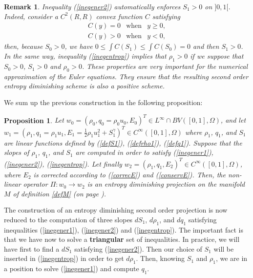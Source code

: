 \documentclass{fldauth}
\theoremstyle{plain}
\theoremstyle{plain}
\theoremstyle{plain}
\newtheorem{prop}{Proposition}
\theoremstyle{plain}
\theoremstyle{plain}
\newtheorem{rem}{Remark}
\theoremstyle{plain}
\begin{document}
\begin{rem}\label{posit}
Inequality (\ref{inegener2}) automatically enforces \( S_{1}>0 \) on \( ]0,1[ \).
Indeed, consider a \( C^{2}(R,R) \) convex function \( C \) satisfying
\begin{eqnarray*}
C(y)=0 & \textrm{when} & y\geq 0,\\
C(y)>0 & \textrm{when} & y<0,
\end{eqnarray*}
then, because \( S_{0}>0 \), we have \( 0\leq \int C(S_{1})\leq \int C(S_{0})=0 \)
and then \( S_{1}>0 \). In the same way, inequality (\ref{inegentrop}) implies
that \( \rho _{1}>0 \) if we suppose that \( S_{0}>0 \), \( S_{1}>0 \) and
\( \rho _{0}>0 \). These properties are very important for the numerical approximation
of the Euler equations. They ensure that the resulting second order entropy
diminishing scheme is also a positive scheme.
\end{rem}
We sum up the previous construction in the following proposition:

\begin{prop}
Let \( w_{0}=(\rho _{0},q_{0}=\rho _{0}u_{0},E_{0})^{T}\in
L^{\infty }\cap BV([0,1],\Omega ) \), and let \( w_{1}=(\rho
_{1},q_{1}=\rho _{1}u_{1},E_{1}=\frac{1}{2}\rho
_{1}u_{1}^{2}+S_{1}^{\gamma })^{T}\in C^{\infty }([0,1],\Omega )
\) where \( \rho _{1} \), \( q_{1} \), and \( S_{1} \) are linear
functions defined by (\ref{defS1}), (\ref{defrho1}),
(\ref{defq1}). Suppose that the slopes of \( \rho _{1} \), \(
q_{1} \), and \( S_{1} \) are computed in order to satisfy
(\ref{inegener1}), (\ref{inegener2}), (\ref{inegentrop}). Let
finally \( w_{2}=(\rho _{1},q_{1},E_{2})^{T}\in C^{\infty
}([0,1],\Omega ) \), where \( E_{2} \) is corrected according to
(\ref{correcE}) and (\ref{conservE}). Then, the non-linear
operator \( \Pi :w_{0}\rightarrow w_{2} \) is an entropy
diminishing projection on the manifold \( M \) of definition
\ref{defM} (on page \pageref{defM}).
\end{prop}
The construction of an entropy diminishing second order projection is now reduced
to the computation of three slopes \( dS_{1} \), \( d\rho _{1} \), and \( dq_{1} \)
satisfying inequalities (\ref{inegener1}), (\ref{inegener2}) and (\ref{inegentrop}).
The important fact is that we have now to solve a \textbf{triangular} set of
inequalities. In practice, we will have first to find a \( dS_{1} \) satisfying
(\ref{inegener2}). Then our choice of \( S_{1} \) will be inserted in (\ref{inegentrop})
in order to get \( d\rho _{1} \). Then, knowing \( S_{1} \) and \( \rho _{1} \),
we are in a position to solve (\ref{inegener1}) and compute \( q_{1} \).
\end{document}
